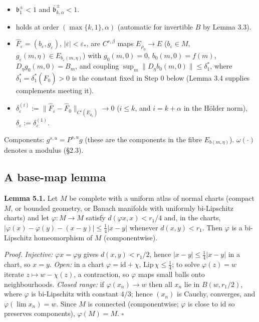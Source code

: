\documentclass[11pt,a4paper]{article}
\theoremstyle{plain}
\theoremstyle{definition}
\theoremstyle{remark}
\numberwithin{equation}{section}
\numberwithin{figure}{section}
\begin{document}
\begin{itemize}
    \item[(B)] $\mathfrak b^\pm_1<1$ and $\bar{\mathfrak b}^\pm_{k,\alpha}<1$.
    \item[(H3)] holds at order $(\max\{k,1\},\alpha)$ (automatic for invertible $B$ by Lemma 3.3).
    \item $\widehat F_\varepsilon=(b_\varepsilon,g_\varepsilon)$, $|\varepsilon|<\varepsilon_*$, are $C^{r,\beta}$ maps $E_{\rho_0}\to E$ ($b_\varepsilon\in M$, $g_\varepsilon(m,\eta)\in E_{b_\varepsilon(m,\eta)}$) with $g_0(m,0)=0$, $b_0(m,0)=f(m)$, $D_\eta g_0(m,0)=B_m$, and coupling $\sup_m\|D_\eta b_0(m,0)\|\le\delta_1^*$, where $\delta_1^*=\delta^*_1(\widehat F_0)>0$ is the constant fixed in Step 0 below (Lemma 3.4 supplies complements meeting it).
    \item $\delta^{(i)}_\varepsilon:=\|\widehat F_\varepsilon-\widehat F_0\|_{C^i(E_{\rho_0})}\to0$ ($i\le k$, and $i=k+\alpha$ in the Hölder norm), $\delta_\varepsilon:=\delta^{(1)}_\varepsilon$.
\end{itemize}

Components: $g^{s,u}=P^{s,u}g$ (these are the components in the fibre $E_{b(m,\eta)}$). $\omega(\cdot)$ denotes a modulus (§2.3).

\subsection{A base-map lemma}

\textbf{Lemma 5.1.} Let $M$ be complete with a uniform atlas of normal charts (compact $M$, or bounded geometry, or Banach manifolds with uniformly bi-Lipschitz charts) and let $\varphi:M\to M$ satisfy $d(\varphi x,x)<r_1/4$ and, in the charts, $|\varphi(x)-\varphi(y)-(x-y)|\le\tfrac14|x-y|$ whenever $d(x,y)<r_1$. Then $\varphi$ is a bi-Lipschitz homeomorphism of $M$ (componentwise).

\textit{Proof.} \textit{Injective:} $\varphi x=\varphi y$ gives $d(x,y)<r_1/2$, hence $|x-y|\le\frac14|x-y|$ in a chart, so $x=y$. \textit{Open:} in a chart $\varphi=\mathrm{id}+\chi$, $\mathrm{Lip}\,\chi\le\tfrac14$; to solve $\varphi(z)=w$ iterate $z\mapsto w-\chi(z)$, a contraction, so $\varphi$ maps small balls onto neighbourhoods. \textit{Closed range:} if $\varphi(x_n)\to w$ then all $x_n$ lie in $B(w,r_1/2)$, where $\varphi$ is bi-Lipschitz with constant $4/3$; hence $(x_n)$ is Cauchy, converges, and $\varphi(\lim x_n)=w$. Since $M$ is connected (componentwise; $\varphi$ is close to $\mathrm{id}$ so preserves components), $\varphi(M)=M$. $\square$
\end{document}

